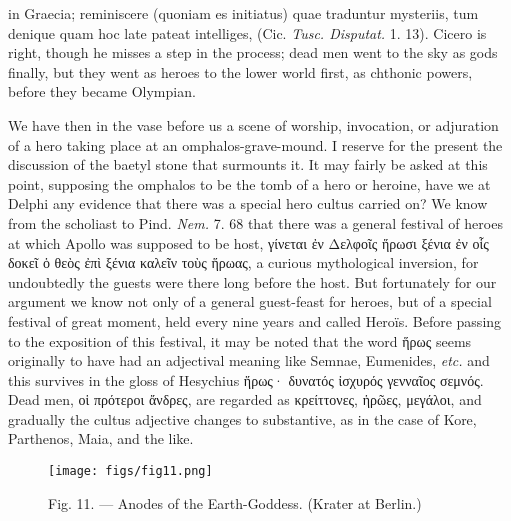 \documentclass[a4paper, 11pt, oneside, polutonikogreek, english]{article}
\begin{document}
in Graecia; reminiscere (quoniam es initiatus) quae traduntur mysteriis, tum denique quam hoc late pateat intelliges, (Cic. \emph{Tusc. Disputat.} 1. 13). Cicero is right, though he misses a step in the process; dead men went to the sky as gods finally, but they went as heroes to the lower world first, as chthonic powers, before they became Olympian.

We have then in the vase before us a scene of worship, invocation, or adjuration of a hero taking place at an omphalos-grave-mound. I reserve for the present the discussion of the baetyl stone that surmounts it. It may fairly be asked at this point, supposing the omphalos to be the tomb of a hero or heroine, have we at Delphi any evidence that there was a special hero cultus carried on? We know from the scholiast to Pind. \emph{Nem.} 7. 68 that there was a general festival of heroes at which Apollo was supposed to be host, γίνεται ἐν Δελφοῖς ἥρωσι ξένια ἐν οἷς δοκεῖ ὁ θεὸς ἐπὶ ξένια καλεῖν τοὺς ἥρωας, a curious mythological inversion, for undoubtedly the guests were there long before the host. But fortunately for our argument we know not only of a general guest-feast for heroes, but of a special festival of great moment, held every nine years and called Heroïs. Before passing to the exposition of this festival, it may be noted that the word ἥρως seems originally to have had an adjectival meaning like Semnae, Eumenides, \emph{etc.} and this survives in the gloss of Hesychius ἥρως· δυνατός ἰσχυρός γενναῖος σεμνός. Dead men, οἱ πρότεροι ἄνδρες, are regarded as κρείττονες, ἡρῶες, μεγάλοι, and gradually the cultus adjective changes to substantive, as in the case of Kore, Parthenos, Maia, and the like.
\begin{figure}[H]
\centering
\texttt{[image: figs/fig11.png]}
\caption{Fig. 11. --- Anodes of the Earth-Goddess. (Krater at Berlin.)}
\end{figure}
\end{document}
